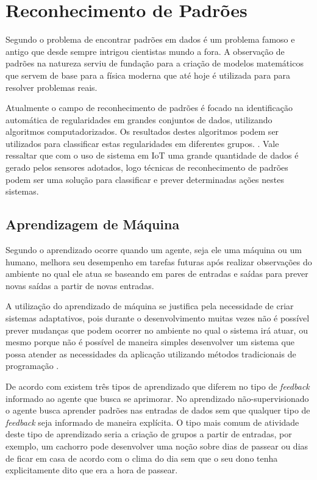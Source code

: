 
\section{Reconhecimento de Padrões}

Segundo  o problema de encontrar padrões em dados é um problema famoso e antigo que desde sempre intrigou cientistas mundo a fora. A observação de padrões na natureza serviu de fundação para a criação de modelos matemáticos que servem de base para a física moderna que até hoje é utilizada para para resolver problemas reais. 

Atualmente o campo de reconhecimento de padrões é focado na identificação automática de regularidades em grandes conjuntos de dados, utilizando algoritmos computadorizados. Os resultados destes algoritmos podem ser utilizados para classificar estas regularidades em diferentes grupos. \cite{bishop:2006}. Vale ressaltar que com o uso de sistema em IoT uma grande quantidade de dados é gerado pelos sensores adotados, logo técnicas de reconhecimento de padrões podem ser uma solução para classificar e prever determinadas ações nestes sistemas.

\subsection{Aprendizagem de Máquina}

Segundo  o aprendizado ocorre quando um agente, seja ele uma máquina ou um humano, melhora seu desempenho em tarefas futuras após realizar observações do ambiente no qual ele atua se baseando em pares de entradas e saídas para prever novas saídas a partir de novas entradas.

A utilização do aprendizado de máquina se justifica pela necessidade de criar sistemas adaptativos, pois durante o desenvolvimento muitas vezes não é possível prever mudanças que podem ocorrer no ambiente no qual o sistema irá atuar, ou mesmo porque não é possível de maneira simples desenvolver um sistema que possa atender as necessidades da aplicação utilizando métodos tradicionais de programação \cite{norvig:780391}.

De acordo com  existem três tipos de aprendizado que diferem no tipo de \textit{feedback} informado ao agente que busca se aprimorar. No aprendizado não-supervisionado o agente busca aprender padrões nas entradas de dados sem que qualquer tipo de \textit{feedback} seja informado de maneira explícita. O tipo mais comum de atividade deste tipo de aprendizado seria a criação de grupos a partir de entradas, por exemplo, um cachorro pode desenvolver uma noção sobre dias de passear ou dias de ficar em casa de acordo com o clima do dia sem que o seu dono tenha explicitamente dito que era a hora de passear.

